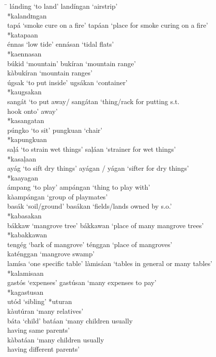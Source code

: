 \begin{tabbing}
\hspace{4.5cm} \= \kill
lánding ‘to land’ \> landíngan ‘airstrip’ \\
\>   *kalandɪngan \\
tapá ‘smoke cure on a fire’ \> tapáan ‘place for smoke curing on a fire’ \\
\>   *katapaan \\
énnas ‘low tide’ \> ennásan ‘tidal flats’ \\
\>   *kaennasan \\
búkid ‘mountain’ \> bukíran ‘mountain range’ \\
\>   kàbukíran ‘mountain ranges’ \\
úgsak ‘to put inside’ \>  ugsákan ‘container’ \\
\>   *kaugsakan \\
sangát ‘to put away/  \> sangátan ‘thing/rack for putting s.t. \\
\hspace{2cm}hook onto' \> away’ \\
\>   *kasangatan \\
púngko ‘to sit’ \> pungkuan ‘chair’ \\
\>   *kapungkuan \\
saļá ‘to strain wet things’ \>  saļáan ‘strainer for wet things’ \\
\>   *kasaļaan \\
ayág ‘to sift dry things’ \>  ayágan / yágan ‘sifter for dry things’ \\
\>   *kaayagan \\
ámpang ‘to play’ \> ampángan ‘thing to play with’ \\
\>   kàampángan ‘group of playmates’ \\
basák ‘soil/ground’ \> basákan ‘fields/lands owned by s.o.’ \\
\>   *kabasakan \\
bákkaw ‘mangrove tree’ \> bákkawan ‘place of  many mangrove trees’ \\
\>   *kabakkawan \\
tengég ‘bark of mangrove’ \> ténggan ‘place of mangroves’ \\
\>   katénggan ‘mangrove swamp’ \\
lamísa ‘one specific table’ \> làmisáan ‘tables in general or many tables’ \\
\>    *kalamisaan \\
gastós ‘expenses’ \> gastúsan ‘many expenses to pay’ \\
\>   *kagastusan \\
utód ‘sibling’ \> *uturan \\
\>   kàutúran ‘many relatives’ \\
báta ‘child’ \> batáan ‘many children usually \\
\> having same parents’ \\
\>  kàbatáan ‘many children usually \\
\>having different parents’
\end{tabbing}
\z

